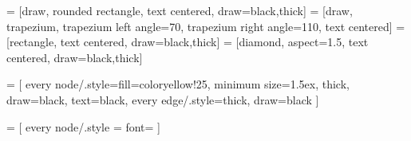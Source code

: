 \author{Chris Geron}
\assi{}


\renewcommand{\itswg}{false}

\usetikzlibrary{fit, positioning, shapes.geometric, shapes.misc}

\newcommand{\tb}[1]{\textbf{#1}}


%
%
 = [draw, rounded rectangle, text centered, draw=black,thick]
 = [draw, trapezium, trapezium left angle=70, trapezium right angle=110, text centered]
 = [rectangle, text centered, draw=black,thick]
 = [diamond, aspect=1.5, text centered, draw=black,thick]


%
%
 = [
  every node/.style={fill=coloryellow!25, minimum size=1.5ex, thick, draw=black, text=black},
  every edge/.style={thick, draw=black}
]


\providecommand{\umltextcolor}{}
\providecommand{\umlfillcolor}{}
\providecommand{\umldrawcolor}{}
\renewcommand{\umltextcolor}{colorblue}
\renewcommand{\umlfillcolor}{coloryellow!20}
\renewcommand{\umldrawcolor}{coloryellow}

 = [
  every node/.style = {font=\footnotesize}
]


\newcommand{\lazytt}[1]{
\smallskip
\noindent\fbox{
  \centering
  \parbox{\dimexpr\linewidth-2\fboxsep-2\fboxrule\relax}{
    \footnotesize\texttt{#1}
  }
}\smallskip
}



